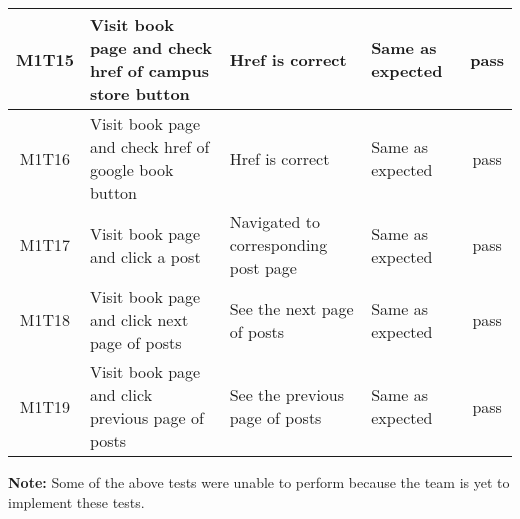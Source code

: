 \documentclass[fullpage]{article}
\begin{document}
\begin{table}[H]
\begin{tabular}{|c|p{4.5cm}|p{3.6cm}|p{3.6cm}|c|}
\hline
M1T15 & Visit book page and check href of campus store button & Href is correct & Same as expected & pass \\
\hline
M1T16 & Visit book page and check href of google book button & Href is correct & Same as expected & pass \\
\hline
M1T17 & Visit book page and click a post & Navigated to corresponding post page & Same as expected & pass \\
\hline
M1T18 & Visit book page and click next page of posts & See the next page of posts & Same as expected & pass \\
\hline
M1T19 & Visit book page and click previous page of posts & See the previous page of posts & Same as expected & pass \\
\hline
\end{tabular}
\end{table}
\textbf{Note: }Some of the above tests were unable to perform because the team is yet to implement these tests.
\end{document}
